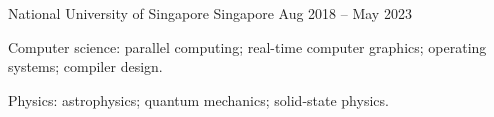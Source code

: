 \begin{cventries}
	{National University of Singapore} %
	{Singapore} %
	{Aug 2018 -- May 2023} %
	{
		\begin{cvitems} %
			\item Computer science: parallel computing; real-time computer graphics; operating systems; compiler design.
			\item Physics: astrophysics; quantum mechanics; solid-state physics.
		\end{cvitems}
	}

\end{cventries}
